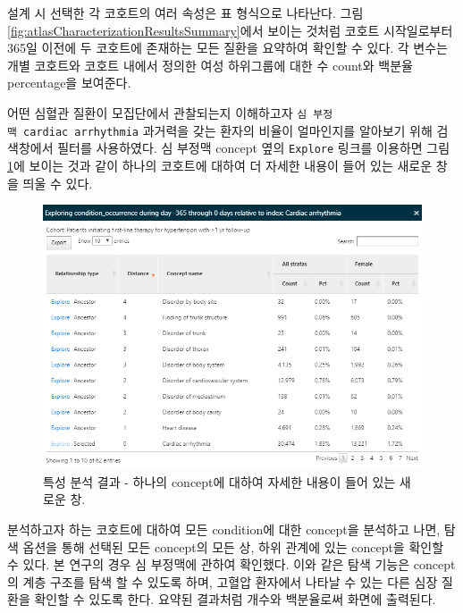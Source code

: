 \documentclass[10.5pt]{book}
\theoremstyle{definition}
\theoremstyle{definition}
\theoremstyle{definition}
\theoremstyle{remark}
\begin{document}
설계 시 선택한 각 코호트의 여러 속성은 표 형식으로 나타난다. 그림
\ref{fig:atlasCharacterizationResultsSummary}에서 보이는 것처럼 코호트
시작일로부터 365일 이전에 두 코호트에 존재하는 모든 질환을 요약하여
확인할 수 있다. 각 변수는 개별 코호트와 코호트 내에서 정의한 여성
하위그룹에 대한 수 count와 백분율 percentage을 보여준다.

어떤 심혈관 질환이 모집단에서 관찰되는지 이해하고자
\texttt{심\ 부정맥\ cardiac\ arrhythmia} 과거력을 갖는 환자의 비율이
얼마인지를 알아보기 위해 검색창에서 필터를 사용하였다. 심 부정맥 concept
옆의 \texttt{Explore} 링크를 이용하면 그림
\ref{fig:atlasCharacterizationResultsExplore}에 보이는 것과 같이 하나의
코호트에 대하여 더 자세한 내용이 들어 있는 새로운 창을 띄울 수 있다.

\begin{figure}

{\centering \includegraphics[width=1\linewidth]{images/Characterization/atlasCharacterizationResultsExplore} 

}

\caption{특성 분석 결과 - 하나의 concept에 대하여 자세한 내용이 들어 있는 새로운 창.}\label{fig:atlasCharacterizationResultsExplore}
\end{figure}

분석하고자 하는 코호트에 대하여 모든 condition에 대한 concept을 분석하고
나면, 탐색 옵션을 통해 선택된 모든 concept의 모든 상, 하위 관계에 있는
concept을 확인할 수 있다. 본 연구의 경우 심 부정맥에 관하여 확인했다.
이와 같은 탐색 기능은 concept의 계층 구조를 탐색 할 수 있도록 하며,
고혈압 환자에서 나타날 수 있는 다른 심장 질환을 확인할 수 있도록 한다.
요약된 결과처럼 개수와 백분율로써 화면에 출력된다.
\end{document}

